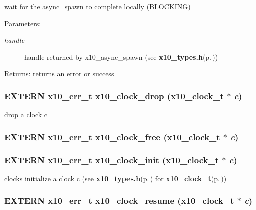 wait for the async\_\-spawn to complete locally (BLOCKING) 

\begin{Desc}
\item[Parameters:]
\begin{description}
\item[{\em handle}]handle returned by x10\_\-async\_\-spawn (see {\bf x10\_\-types.h}{\rm (p.\,\pageref{x10__types_8h})})\end{description}
\end{Desc}
\begin{Desc}
\item[Returns:]returns an error or success \end{Desc}
\subsubsection{\setlength{\rightskip}{0pt plus 5cm}EXTERN {\bf x10\_\-err\_\-t} x10\_\-clock\_\-drop ({\bf x10\_\-clock\_\-t} $\ast$ {\em c})}\label{x10_8h_a15}


drop a clock c 

\subsubsection{\setlength{\rightskip}{0pt plus 5cm}EXTERN {\bf x10\_\-err\_\-t} x10\_\-clock\_\-free ({\bf x10\_\-clock\_\-t} $\ast$ {\em c})}\label{x10_8h_a13}


\subsubsection{\setlength{\rightskip}{0pt plus 5cm}EXTERN {\bf x10\_\-err\_\-t} x10\_\-clock\_\-init ({\bf x10\_\-clock\_\-t} $\ast$ {\em c})}\label{x10_8h_a12}


clocks initialize a clock c (see {\bf x10\_\-types.h}{\rm (p.\,\pageref{x10__types_8h})} for {\bf x10\_\-clock\_\-t}{\rm (p.\,\pageref{structx10__clock__t})}) 

\subsubsection{\setlength{\rightskip}{0pt plus 5cm}EXTERN {\bf x10\_\-err\_\-t} x10\_\-clock\_\-resume ({\bf x10\_\-clock\_\-t} $\ast$ {\em c})}\label{x10_8h_a14}


